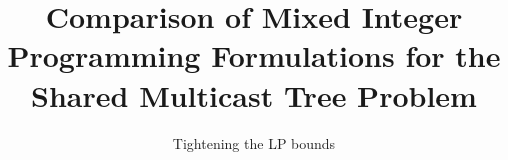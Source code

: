 


\makeatletter
\def\user@resume{resume}
\def\user@intermezzo{intermezzo}
%
\setcounter{savedparentequation}{1}
% 
\renewenvironment{subequations}[1][]{%
      \def\user@decides{#1}%
      \setcounter{previousequation}{\value{equation}}%
      \ifx\user@decides\user@resume 
           \setcounter{equation}{\value{savedparentequation}}%
      \else  
      \ifx\user@decides\user@intermezzo
           \refstepcounter{equation}%
      \else
           \setcounter{lastsubequation}{0}%
           \refstepcounter{equation}%
      \fi\fi
      \protected@edef\theHparentequation{%
          \@ifundefined {theHequation}\theequation \theHequation}%
      \protected@edef\theparentequation{\theequation}%
      \setcounter{parentequation}{\value{equation}}%
      \ifx\user@decides\user@resume 
           \setcounter{equation}{\value{lastsubequation}}%
         \else
           \setcounter{equation}{0}%
      \fi
      \def\theequation  {\theparentequation  \alph{equation}}%
      \def\theHequation {\theHparentequation \alph{equation}}%
      \ignorespaces
}{%
  \ifx\user@decides\user@resume
       \setcounter{lastsubequation}{\value{equation}}%
       \setcounter{equation}{\value{previousequation}}%
  \else
  \ifx\user@decides\user@intermezzo
       \setcounter{equation}{\value{parentequation}}%
  \else
       \setcounter{lastsubequation}{\value{equation}}%
       \setcounter{savedparentequation}{\value{parentequation}}%
       \setcounter{equation}{\value{parentequation}}%
  \fi\fi
  \ignorespacesafterend
}
\makeatother



\title{Comparison of Mixed Integer Programming Formulations for the Shared Multicast Tree Problem%
}
\subtitle{Tightening the LP bounds}

